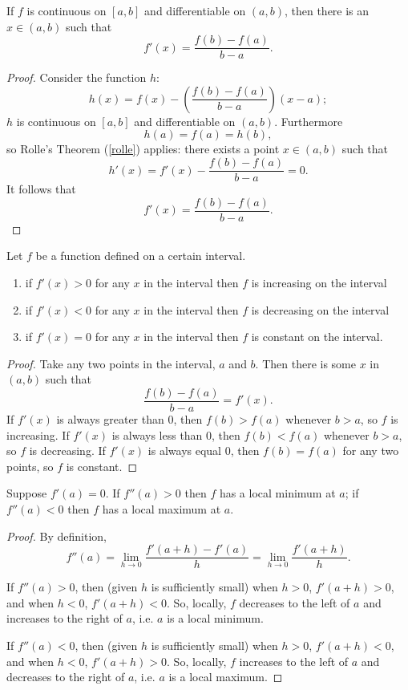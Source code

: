 \begin{theorem} \label{deriv_mvt}
If $f$ is continuous on $[a, b]$ and differentiable on $(a, b)$, then there is an $x \in (a, b)$ such that 
\[ f'(x) = \frac{f(b)-f(a)}{b-a}. \]

\begin{proof}
Consider the function $h$:
\[ h(x) = f(x) - \left(\frac{f(b)-f(a)}{b-a}\right)(x-a); \]
$h$ is continuous on $[a, b]$ and differentiable on $(a, b)$. Furthermore 
\[ h(a) = f(a) = h(b), \]
so Rolle's Theorem (\ref{rolle}) applies: there exists a point $x \in (a, b)$ such that
\[ h'(x) = f'(x) - \frac{f(b)-f(a)}{b-a} = 0. \]
It follows that 
\[ f'(x) = \frac{f(b)-f(a)}{b-a}. \]
\end{proof}
\end{theorem}

\begin{corollary}
Let $f$ be a function defined on a certain interval. 
\begin{enumerate}
\item if $f'(x) > 0$ for any $x$ in the interval then $f$ is increasing on the interval
\item if $f'(x) < 0$ for any $x$ in the interval then $f$ is decreasing on the interval
\item if $f'(x) = 0$ for any $x$ in the interval then $f$ is constant   on the interval.
\end{enumerate}

\begin{proof}
Take any two points in the interval, $a$ and $b$. Then there is some $x$ in $(a, b)$ such that 
\[ \frac{f(b)-f(a)}{b-a} = f'(x). \]
If $f'(x)$ is always greater than 0, then $f(b) > f(a)$ whenever $b > a$, so $f$ is increasing. If $f'(x)$ is always less than 0, then $f(b) < f(a)$ whenever $b > a$, so $f$ is decreasing. If $f'(x)$ is always equal 0, then $f(b) = f(a)$ for any two points, so $f$ is constant.
\end{proof}
\end{corollary}

\begin{theorem} \label{twoderivminmax}
Suppose $f'(a) = 0$. If $f''(a) > 0$ then $f$ has a local minimum at $a$; if $f''(a) < 0$ then $f$ has a local maximum at $a$.

\begin{proof}
By definition,
\[ f''(a) = \lim_{h \to 0} \frac{f'(a+h)-f'(a)}{h} = \lim_{h \to 0} \frac{f'(a+h)}{h}. \]

If $f''(a) > 0$, then (given $h$ is sufficiently small) when $h > 0$, $f'(a+h) > 0$, and when $h < 0$, $f'(a+h) < 0$. So, locally, $f$ decreases to the left of $a$ and increases to the right of $a$, i.e. $a$ is a local minimum. 

If $f''(a) < 0$, then (given $h$ is sufficiently small) when $h > 0$, $f'(a+h) < 0$, and when $h < 0$, $f'(a+h) > 0$. So, locally, $f$ increases to the left of $a$ and decreases to the right of $a$, i.e. $a$ is a local maximum. 
\end{proof}
\end{theorem}

